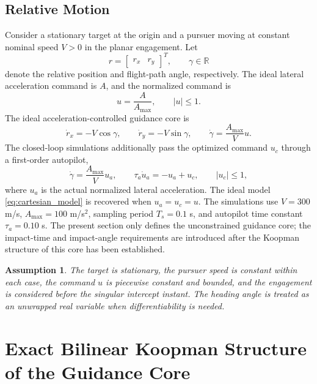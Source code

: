 \documentclass[letterpaper,journal]{IEEEtran}
\newtheorem{assumption}{Assumption}
\begin{document}
\subsection{Relative Motion}
Consider a stationary target at the origin and a pursuer moving at constant nominal speed $V>0$ in the planar engagement. Let
\begin{equation}
    r=\begin{bmatrix}r_x&r_y\end{bmatrix}^T,\qquad
    \gamma\in\mathbb R
\end{equation}
denote the relative position and flight-path angle, respectively. The ideal lateral acceleration command is $A$, and the normalized command is
\begin{equation}
    u=\frac{A}{A_{\max}},\qquad |u|\le 1 .
\end{equation}
The ideal acceleration-controlled guidance core is
\begin{equation}
    \dot r_x=-V\cos\gamma,\qquad
    \dot r_y=-V\sin\gamma,\qquad
    \dot\gamma=\frac{A_{\max}}{V}u .
    \label{eq:cartesian_model}
\end{equation}
The closed-loop simulations additionally pass the optimized command $u_c$ through a first-order autopilot,
\begin{equation}
    \dot\gamma=\frac{A_{\max}}{V}u_a,\qquad
    \tau_a\dot u_a=-u_a+u_c,\qquad |u_c|\le1 ,
    \label{eq:autopilot}
\end{equation}
where $u_a$ is the actual normalized lateral acceleration. The ideal model \eqref{eq:cartesian_model} is recovered when $u_a=u_c=u$. The simulations use $V=300$ m/s, $A_{\max}=100$ m/s$^2$, sampling period $T_s=0.1$ s, and autopilot time constant $\tau_a=0.10$ s. The present section only defines the unconstrained guidance core; the impact-time and impact-angle requirements are introduced after the Koopman structure of this core has been established.

\begin{assumption}
The target is stationary, the pursuer speed is constant within each case, the command $u$ is piecewise constant and bounded, and the engagement is considered before the singular intercept instant. The heading angle is treated as an unwrapped real variable when differentiability is needed.
\end{assumption}

\section{Exact Bilinear Koopman Structure of the Guidance Core}
\end{document}
